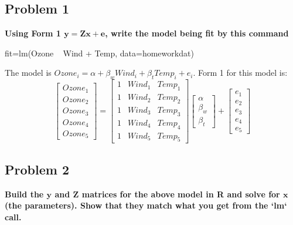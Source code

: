 \subsection*{Problem 1}
{\bf Using Form 1 $\mathbf{y}=\mathbf{Z}\mathbf{x}+\mathbf{e}$, write the model being fit by this command}
\begin{Schunk}
\begin{Sinput}
 fit=lm(Ozone ~ Wind + Temp, data=homeworkdat)
\end{Sinput}
\end{Schunk}
The model is $Ozone_i = \alpha + \beta_w Wind_i + \beta_t Temp_i + e_i$.  Form 1 for this model is:
$$
\begin{bmatrix} Ozone_1 \\ Ozone_2  \\ Ozone_3 \\ Ozone_4 \\ Ozone_5 \end{bmatrix}=
\begin{bmatrix} 1 & Wind_1 & Temp_1\\ 1 & Wind_2 & Temp_2 \\ 1 & Wind_3 & Temp_3 \\ 1 & Wind_4 & Temp_4 \\ 1 & Wind_5 & Temp_5 \end{bmatrix}
\begin{bmatrix} \alpha \\ \beta_w \\ \beta_t \end{bmatrix} + 
\begin{bmatrix} e_1 \\ e_2 \\ e_3 \\ e_4 \\ e_5 \end{bmatrix}
$$

\subsection*{Problem 2}
{\bf Build the $\mathbf{y}$ and $\mathbf{Z}$ matrices for the above model in R and solve for $\mathbf{x}$ (the parameters).  Show that they match what you get from the `lm` call.}

